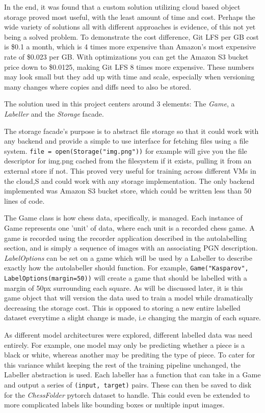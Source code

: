In the end, it was found that a custom solution utilizing cloud based object storage proved most useful, with the least amount of time and cost.  
Perhaps the wide variety of solutions all with different approaches is evidence, of this not yet being
a solved problem.  To demonstrate the cost difference, Git LFS per GB cost is \$0.1 a month, which is 4 times more expensive
than Amazon's most expensive rate of \$0.023 per GB.  With optimizations you can get the Amazon S3 bucket price down to \$0.0125, making Git LFS 8 times
more expensive.  These numbers may look small but they add up with time and scale, especially when versioning many changes where copies and diffs need
to also be stored.

The solution used in this project centers around 3 elements: The \textit{Game}, a \textit{Labeller} and the \textit{Storage} facade.  

The storage 
facade's purpose is to abstract file storage so that it could work with any backend and provide a simple to use interface for fetching files using a file system.
\verb|file = open(Storage("img.png"))| 
for example will give you the file descriptor for img.png cached from the filesystem if it exists, pulling it from an external store if not.  
This proved very useful for training across different VMs in the cloud,S and could work with any storage implementation.
The only backend implemented was Amazon S3 bucket store, which could be written less than 50 lines of code.

The Game class is how chess data, specifically, is managed.  Each instance of Game represents one 'unit' of data, where each unit is a recorded chess game.
A game is recorded using the recorder application described in the autolabelling section, and is simply a sequence of images with
an associating PGN description. \textit{LabelOptions} can be set on a game which will be used by a Labeller to describe exactly how the autolabeller 
should function.  For example, \verb|Game("Kasparov", LabelOptions(margin=50))| will create a game that should be labelled
with a margin of 50px surrounding each square.  As will be discussed later, it is this game object that will version the data used to train a model while dramatically
decreasing the storage cost.  This is opposed to storing a new entire labelled dataset everytime a slight change is made, i.e changing the margin of each square.

As different model architectures were explored, different labelled data was need entirely.  For example, one model may only be 
predicting whether a piece is a black or white, whereas another may be prediting the type of piece.  To cater for this variance whilst keeping the rest of the 
training pipeline unchanged, the Labeller abstraction is used.  Each labeller has a function that can take in a Game and output a series of \verb|(input, target)| pairs.
These can then be saved to disk for the \textit{ChessFolder} pytorch dataset to handle. 
This could even be extended to more complicated labels like bounding boxes or multiple input images.

